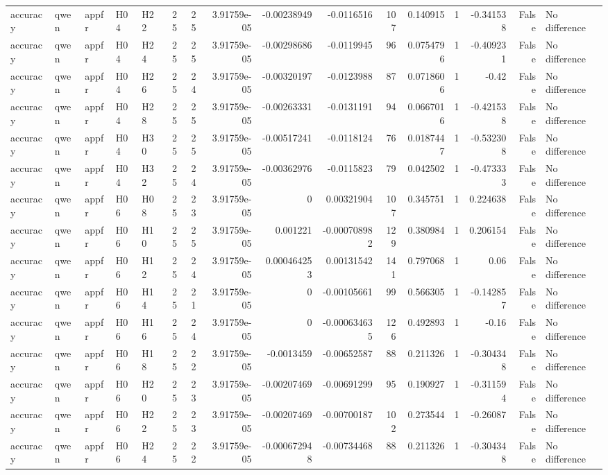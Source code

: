 \begin{longtable}{lllllrrrrrrrrrrl}
accuracy & qwen & appfr & H04 & H22 & 25 & 25 & 3.91759e-05 & -0.00238949 & -0.0116516 & 107 & 0.140915 & 1 & -0.341538 & False & No difference \\
accuracy & qwen & appfr & H04 & H24 & 25 & 25 & 3.91759e-05 & -0.00298686 & -0.0119945 & 96 & 0.0754796 & 1 & -0.409231 & False & No difference \\
accuracy & qwen & appfr & H04 & H26 & 25 & 24 & 3.91759e-05 & -0.00320197 & -0.0123988 & 87 & 0.0718606 & 1 & -0.42 & False & No difference \\
accuracy & qwen & appfr & H04 & H28 & 25 & 25 & 3.91759e-05 & -0.00263331 & -0.0131191 & 94 & 0.0667016 & 1 & -0.421538 & False & No difference \\
accuracy & qwen & appfr & H04 & H30 & 25 & 25 & 3.91759e-05 & -0.00517241 & -0.0118124 & 76 & 0.0187447 & 1 & -0.532308 & False & No difference \\
accuracy & qwen & appfr & H04 & H32 & 25 & 24 & 3.91759e-05 & -0.00362976 & -0.0115823 & 79 & 0.042502 & 1 & -0.473333 & False & No difference \\
accuracy & qwen & appfr & H06 & H08 & 25 & 23 & 3.91759e-05 & 0 & 0.00321904 & 107 & 0.345751 & 1 & 0.224638 & False & No difference \\
accuracy & qwen & appfr & H06 & H10 & 25 & 25 & 3.91759e-05 & 0.001221 & -0.000708982 & 129 & 0.380984 & 1 & 0.206154 & False & No difference \\
accuracy & qwen & appfr & H06 & H12 & 25 & 24 & 3.91759e-05 & 0.000464253 & 0.00131542 & 141 & 0.797068 & 1 & 0.06 & False & No difference \\
accuracy & qwen & appfr & H06 & H14 & 25 & 21 & 3.91759e-05 & 0 & -0.00105661 & 99 & 0.566305 & 1 & -0.142857 & False & No difference \\
accuracy & qwen & appfr & H06 & H16 & 25 & 24 & 3.91759e-05 & 0 & -0.000634635 & 126 & 0.492893 & 1 & -0.16 & False & No difference \\
accuracy & qwen & appfr & H06 & H18 & 25 & 22 & 3.91759e-05 & -0.0013459 & -0.00652587 & 88 & 0.211326 & 1 & -0.304348 & False & No difference \\
accuracy & qwen & appfr & H06 & H20 & 25 & 23 & 3.91759e-05 & -0.00207469 & -0.00691299 & 95 & 0.190927 & 1 & -0.311594 & False & No difference \\
accuracy & qwen & appfr & H06 & H22 & 25 & 23 & 3.91759e-05 & -0.00207469 & -0.00700187 & 102 & 0.273544 & 1 & -0.26087 & False & No difference \\
accuracy & qwen & appfr & H06 & H24 & 25 & 22 & 3.91759e-05 & -0.000672948 & -0.00734468 & 88 & 0.211326 & 1 & -0.304348 & False & No difference \\

\end{longtable}
